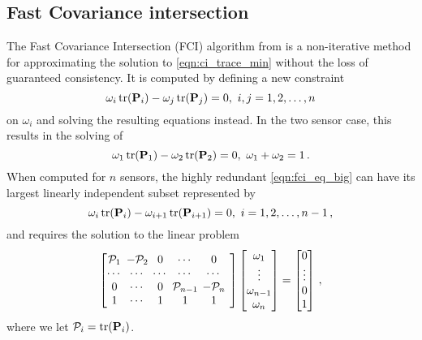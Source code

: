 \documentclass[letterpaper, 10 pt, journal, twoside]{ieeetran}  %
\begin{document}
\subsection{Fast Covariance intersection}
The Fast Covariance Intersection (FCI) algorithm from \cite{niehsenInformationFusionBased2002} is a non-iterative method for approximating the solution to \eqref{eqn:ci_trace_min} without the loss of guaranteed consistency. It is computed by defining a new constraint
\begin{equation}
   \omega_i \operatorname{tr}({{\mathbf{P}}}_i) - \omega_j \operatorname{tr}({{\mathbf{P}}}_j) = 0,\ i,j=1,2,\dots,n \label{eqn:fci_eq_big}
\end{equation}
on $\omega_i$ and solving the resulting equations instead. In the two sensor case, this results in the solving of
\begin{equation}
   \omega_1 \operatorname{tr}({{\mathbf{P}}}_1) - \omega_2 \operatorname{tr}({{\mathbf{P}}}_2) = 0,\ \omega_1 + \omega_2 = 1\,. \label{eqn:fci_2sen_omega_sum_eq}
\end{equation}
When computed for $n$ sensors, the highly redundant \eqref{eqn:fci_eq_big} can have its largest linearly independent subset represented by
\begin{equation}
   \omega_i \operatorname{tr}({{\mathbf{P}}}_i) - \omega_{i+1} \operatorname{tr}({{\mathbf{P}}}_{i+1}) = 0,\ i=1,2,\dots,n-1\,, \label{eqn:fci_eq}
\end{equation}
and requires the solution to the linear problem
\begin{equation}
   \begingroup
   \setlength\arraycolsep{2pt}
   \begin{bmatrix}
      \mathcal{P}_1 & -\mathcal{P}_2 & 0 & \cdots & 0 \\
      \cdots & \cdots & \cdots & \cdots & \cdots & \\
      0 & \cdots & 0 & \mathcal{P}_{n-1} & -\mathcal{P}_{n} \\
      1 & \cdots & 1 & 1 & 1 &
   \end{bmatrix}
   \begin{bmatrix}
      \omega_1 \\
      \vdots \\
      \omega_{n-1} \\
      \omega_{n}
   \end{bmatrix}
   =
   \begin{bmatrix}
      0 \\
      \vdots \\
      0 \\
      1
   \end{bmatrix}\,, \label{eqn:fci_eq_sys}
   \endgroup
\end{equation}
where we let $\mathcal{P}_i = \operatorname{tr}({{\mathbf{P}}}_i)$.
\end{document}
